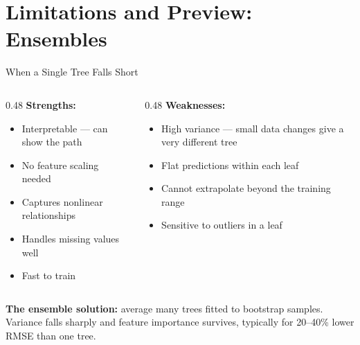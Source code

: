\documentclass[aspectratio=169, 11pt]{beamer}
\begin{document}
\section{Limitations and Preview: Ensembles}


\begin{frame}{When a Single Tree Falls Short}
  \begin{columns}[T]
    \begin{column}{0.48\textwidth}
      \textbf{Strengths:}
      {
      \begin{itemize}\small
        \item Interpretable --- can show the path
        \item No feature scaling needed
        \item Captures nonlinear relationships
        \item Handles missing values well
        \item Fast to train
      \end{itemize}}
    \end{column}
    \begin{column}{0.48\textwidth}
      \textbf{Weaknesses:}
      {
      \begin{itemize}\small
        \item High variance --- small data changes give a very different tree
        \item Flat predictions within each leaf
        \item Cannot extrapolate beyond the training range
        \item Sensitive to outliers in a leaf
      \end{itemize}}
    \end{column}
  \end{columns}
  \vspace{0.2cm}
  \textbf{The ensemble solution:} average many trees fitted to bootstrap samples. Variance falls
  sharply and feature importance survives, typically for 20--40\% lower RMSE than one tree.
\end{frame}
\end{document}
